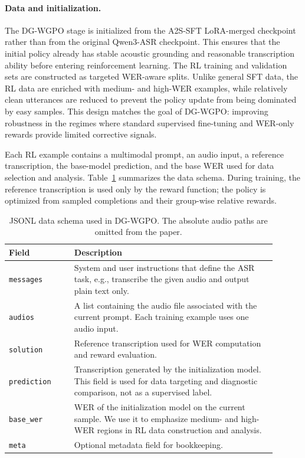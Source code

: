 \documentclass{llmxive}
\begin{document}
\paragraph{Data and initialization.}
The DG-WGPO stage is initialized from the A2S-SFT LoRA-merged checkpoint rather
than from the original Qwen3-ASR checkpoint. This ensures that the initial policy
already has stable acoustic grounding and reasonable transcription ability before
entering reinforcement learning. The RL training and validation sets are
constructed as targeted WER-aware splits. Unlike general SFT data, the RL data are
enriched with medium- and high-WER examples, while relatively clean utterances are
reduced to prevent the policy update from being dominated by easy samples. This
design matches the goal of DG-WGPO: improving robustness in the regimes where
standard supervised fine-tuning and WER-only rewards provide limited corrective
signals.

Each RL example contains a multimodal prompt, an audio input, a reference
transcription, the base-model prediction, and the base WER used for data
selection and analysis. Table~\ref{tab:dg_wgpo_data_schema} summarizes the data
schema. During training, the reference transcription is used only by the reward
function; the policy is optimized from sampled completions and their group-wise
relative rewards.

\begin{table}[t]
\centering
\small
\begin{tabular}{p{0.22\linewidth} p{0.68\linewidth}}
\toprule
\textbf{Field} & \textbf{Description} \\
\midrule
\texttt{messages}
& System and user instructions that define the ASR task, e.g., transcribe the
given audio and output plain text only. \\

\texttt{audios}
& A list containing the audio file associated with the current prompt. Each
training example uses one audio input. \\

\texttt{solution}
& Reference transcription used for WER computation and reward evaluation. \\

\texttt{prediction}
& Transcription generated by the initialization model. This field is used for
data targeting and diagnostic comparison, not as a supervised label. \\

\texttt{base\_wer}
& WER of the initialization model on the current sample. We use it to emphasize
medium- and high-WER regions in RL data construction and analysis. \\

\texttt{meta}
& Optional metadata field for bookkeeping. \\
\bottomrule
\end{tabular}
\vspace{-2mm}
\caption{
JSONL data schema used in DG-WGPO. The absolute audio paths are omitted from the
paper.
}
\label{tab:dg_wgpo_data_schema}
\end{table}
\end{document}
